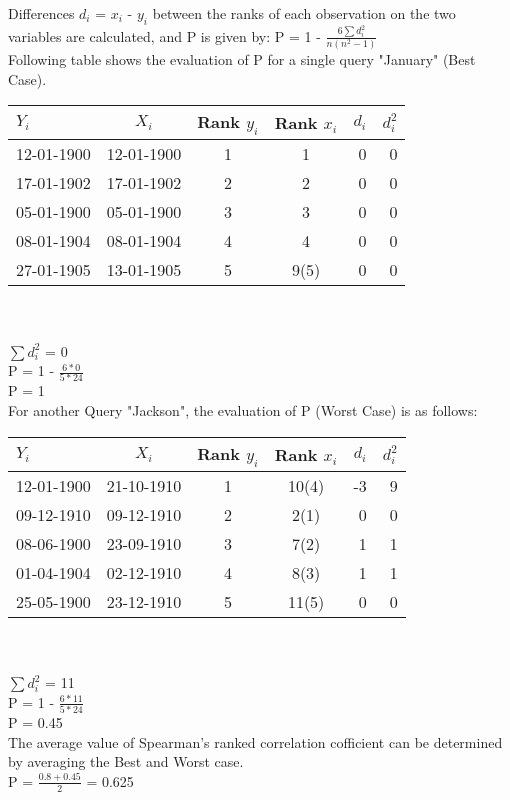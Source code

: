 Differences $d_{i}$ = $x_{i}$ - $y_{i}$  between the ranks of each observation on the two variables are calculated, and P is given by:
P = 1 - $\frac {6\sum d_i^2 }{n(n^2-1)}$ \\

Following table shows the evaluation of P for a single query "January" (Best Case).

\begin{tabular}{ l | c | c | c | r | r }
$Y_{i}$ & $X_{i}$ & Rank $y_{i}$ & Rank $x_{i}$ & $d_{i}$ & $d_{i}^2$ \\
\hline
  12-01-1900 & 12-01-1900 & 1 & 1 & 0 & 0 \\
  17-01-1902 & 17-01-1902 & 2 & 2 & 0 & 0 \\
  05-01-1900 & 05-01-1900 & 3 & 3 & 0 & 0 \\
  08-01-1904 & 08-01-1904 & 4 & 4 & 0 & 0 \\
  27-01-1905 & 13-01-1905 & 5 & 9(5) & 0 & 0 \\
\end{tabular}
\\
\\
${\sum d_i^2}$ = 0 \\
P = 1 - $\frac{6*0}{5*24}$ \\
P = 1 \\

For another Query "Jackson", the evaluation of P (Worst Case) is as follows:

\begin{tabular}{ l | c | c | c | r | r }
 $Y_{i}$ & $X_{i}$ & Rank $y_{i}$ & Rank $x_{i}$ & $d_{i}$ & $d_{i}^2$ \\
\hline
  12-01-1900 & 21-10-1910 & 1 & 10(4) & -3 & 9 \\
  09-12-1910 & 09-12-1910 & 2 & 2(1) & 0 & 0 \\
  08-06-1900 & 23-09-1910 & 3 & 7(2) & 1 & 1 \\
  01-04-1904 & 02-12-1910 & 4 & 8(3) & 1 & 1 \\
  25-05-1900 & 23-12-1910 & 5 & 11(5) & 0 & 0 \\
\end{tabular}
\\
\\
${\sum d_i^2}$ = 11 \\
P = 1 - $\frac{6*11}{5*24}$ \\
P = 0.45 \\

The average value of Spearman's ranked correlation cofficient can be determined by averaging the Best and Worst case. \\
P = $\frac {0.8+0.45}{2}$ = 0.625 \\



